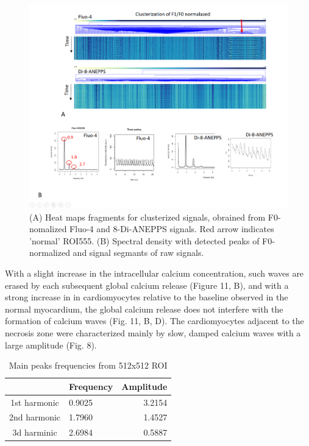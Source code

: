 \documentclass{biophys-new}
\begin{document}
\begin{figure}
    \includegraphics[width=0.9\linewidth]{fig6.png}
    \caption{(A) Heat maps fragments for clusterized signals, obrained from  F0-nomalized Fluo-4 and 8-Di-ANEPPS signals. Red arrow indicates 'normal' ROI555. (B) Spectral density with detected peaks of F0-normalized and signal segmants of raw signals.}
    \label{fig:fig6}
\end{figure}


 With a slight increase in the intracellular calcium concentration, such waves are erased by each subsequent global calcium release (Figure 11, B), and with a strong increase in  in cardiomyocytes relative to the baseline observed in the normal myocardium, the global calcium release does not interfere with the formation of calcium waves (Fig. 11, B, D).
 The cardiomyocytes adjacent to the necrosis zone were characterized mainly by slow, damped calcium waves with a large amplitude (Fig. 8).

 \begin{table}[hb!]
 \caption{Main peaks frequencies from 512x512 ROI}
 \label{tab:freq}
 \centering
 \begin{threeparttable}
 \begin{tabular}{c l r}
 \hline
  & Frequency & Amplitude  \\\hline
 1st harmonic & 0.9025 & 3.2154 \\
 2nd harmonic & 1.7960 & 1.4527  \\
 3d harminic & 2.6984 & 0.5887    \\
 \hline
 \end{tabular}
 \end{threeparttable}
 \end{table}
\end{document}
